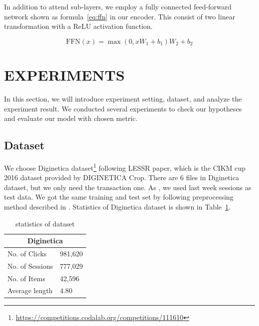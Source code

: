 \documentclass{article}
\begin{document}
In addition to attend sub-layers,
we employ a fully connected feed-forward network
shown as formula~\ref{eq:ffn} in our encoder.
This consist of two linear transformation with a ReLU activation function.

\begin{equation}
    \label{eq:ffn}
    \textrm{FFN}\left(x\right)=\max{\left(0,xW_1+b_1\right)}W_2+b_2
\end{equation}




\section{EXPERIMENTS}

In this section, we will introduce experiment setting,
dataset, and analyze the experiment result.
We conducted several experiments to check our hypotheses and evaluate our
model with chosen metric.

\subsection{Dataset}

We choose Diginetica dataset\footnote{\url{https://competitions.codalab.org/competitions/111610}}
following LESSR \cite{chen2020lessr} paper,
which is the CIKM cup 2016 dataset provided by DIGINETICA Crop.
There are 6 files in Diginetica dataset, but we only need the transaction one.
As \cite{chen2020lessr}, we used last week sessions as test data.
We got the same training and test set by following preprocessing method
described in \cite{chen2020lessr}.
Statistics of Diginetica dataset is shown in Table~\ref{data-stats}.

\begin{table}
    \caption{statistics of dataset}
    \label{data-stats}
    \centering
    \begin{tabular}{ll}
        \toprule
        \multicolumn{2}{c}{Diginetica} \\
        \midrule
        No. of Clicks   & 981,620      \\
        No. of Sessions & 777,029      \\
        No. of Items    & 42,596       \\
        Average length  & 4.80         \\
        \bottomrule
    \end{tabular}
\end{table}
\end{document}
